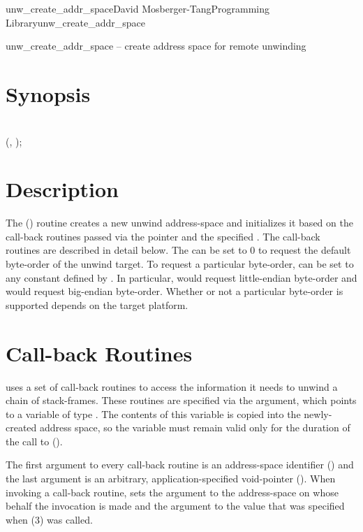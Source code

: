 \documentclass{article}
\begin{document}
\begin{Name}{3}{unw\_create\_addr\_space}{David Mosberger-Tang}{Programming Library}{unw\_create\_addr\_space}

  unw\_create\_addr\_space -- create address space for remote unwinding
\end{Name}

\section{Synopsis}

\\

 (,  );\\

\section{Description}

The () routine creates a new unwind
address-space and initializes it based on the call-back routines
passed via the  pointer and the specified .
The call-back routines are described in detail below.  The
 can be set to 0 to request the default byte-order of
the unwind target.  To request a particular byte-order,
 can be set to any constant defined by
.  In particular,  would
request little-endian byte-order and  would
request big-endian byte-order.  Whether or not a particular byte-order
is supported depends on the target platform.

\section{Call-back Routines}

 uses a set of call-back routines to access the
information it needs to unwind a chain of stack-frames.  These
routines are specified via the  argument, which points to a
variable of type .  The contents of this
variable is copied into the newly-created address space, so the
variable must remain valid only for the duration of the call to
().

The first argument to every call-back routine is an address-space
identifier () and the last argument is an arbitrary,
application-specified void-pointer ().  When invoking a
call-back routine,  sets the  argument to the
address-space on whose behalf the invocation is made and the 
argument to the value that was specified when
(3) was called.
\end{document}
